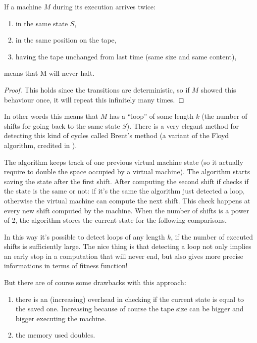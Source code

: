 \documentclass{report}
\begin{document}
\begin{Thm}
If a machine $M$ during its execution arrives twice:
\begin{enumerate}
\item in the same state $S$,
\item in the same position on the tape,
\item having the tape unchanged from last time (same size and same content),
\end{enumerate}
means that M will never halt.
\end{Thm}
\begin{proof}
This holds since the transitions are deterministic, so if $M$ showed this behaviour once, it will repeat this infinitely many times.
\end{proof}

In other words this means that $M$ has a ``loop'' of some length $k$ (the number of shifts for going back to the same state $S$). There is a very elegant method for detecting this kind of cycles called Brent's method \cite{brent} (a variant of the Floyd algorithm, credited in \cite{knuth}).

The algorithm keeps track of one previous virtual machine state (so it actually require to double the space occupied by a virtual machine). The algorithm starts saving the state after the first shift. After computing the second shift if checks if the state is the same or not: if it's the same the algorithm just detected a loop, otherwise the virtual machine can compute the next shift. This check happens at every new shift computed by the machine. When the number of shifts is a power of 2, the algorithm stores the current state for the following comparisons.

In this way it's possible to detect loops of any length $k$, if the number of executed shifts is sufficiently large. The nice thing is that detecting a loop not only implies an early stop in a computation that will never end, but also gives more precise informations in terms of fitness function!

But there are of course some drawbacks with this approach:
\begin{enumerate}
\item there is an (increasing) overhead in checking if the current state is equal to the saved one. Increasing because of course the tape size can be bigger and bigger executing the machine.
\item the memory used doubles.
\end{enumerate}
\end{document}
